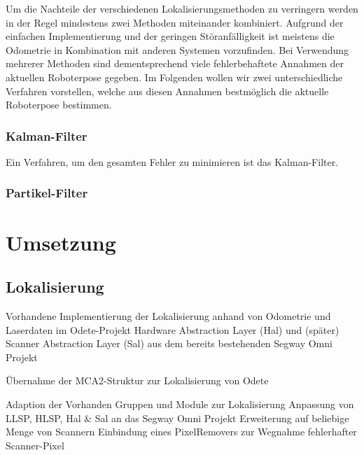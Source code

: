 Um die Nachteile der verschiedenen Lokalisierungsmethoden zu
 verringern werden in der Regel mindestens zwei Methoden miteinander
 kombiniert. Aufgrund der einfachen Implementierung und der geringen
 Störanfälligkeit ist meistens die Odometrie in Kombination mit
 anderen Systemen vorzufinden. Bei Verwendung mehrerer Methoden sind
 dementsprechend viele fehlerbehaftete Annahmen der aktuellen
 Roboterpose gegeben. Im Folgenden wollen wir zwei unterschiedliche
 Verfahren vorstellen, welche aus diesen Annahmen bestmöglich die
 aktuelle Roboterpose bestimmen.
 
\subsubsection{Kalman-Filter}
  Ein Verfahren, um den gesamten Fehler zu minimieren ist das
  Kalman-Filter.
\subsubsection{Partikel-Filter}
 
\section{Umsetzung}
\label{lokalisierung_umsetzung_sec}
\authorsection{\editordummy}
\subsection{Lokalisierung}
 
 Vorhandene
 Implementierung der Lokalisierung anhand von Odometrie und Laserdaten im Odete-Projekt
Hardware Abstraction Layer (Hal) und (später) Scanner Abstraction Layer (Sal)
aus dem bereits bestehenden Segway Omni Projekt

Übernahme der MCA2-Struktur zur Lokalisierung von Odete

Adaption der Vorhanden Gruppen und Module zur Lokalisierung 
Anpassung von LLSP, HLSP, Hal \& Sal an das Segway Omni Projekt
Erweiterung auf beliebige Menge von Scannern
Einbindung eines PixelRemovers zur Wegnahme fehlerhafter Scanner-Pixel

